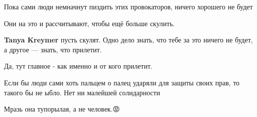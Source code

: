 \begin{itemize}
Пока сами люди немначнут пиздить этих провокаторов, ничего хорошего не будет

\begin{itemize}
 
Они на это и рассчитывают, чтобы ещё больше скулить.

 
\textbf{Tanya Kreymer} пусть скулят. Одно дело знать, что тебе за это ничего не будет, а другое — знать, что прилетит.

 
Да, тут главное - как именно и от кого прилетит.

 
Если бы люди сами хоть пальцем о палец ударяли для защиты своих прав, то такого
бы не ыбло. Нет ни малейшей солидарности
\end{itemize}

 
Мразь она тупорылая, а не человек.😡

 


\end{itemize}
